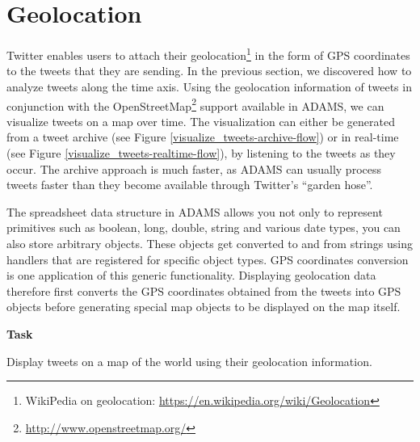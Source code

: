 \documentclass[a4paper,10pt]{book}
\newcommand{\heading}[1]{
  \vspace{0.3cm} \noindent \textbf{#1} \newline
}
\begin{document}
\clearpage
\newpage
\section{Geolocation}
Twitter enables users to attach their geolocation\footnote{WikiPedia on geolocation: \url{https://en.wikipedia.org/wiki/Geolocation}{}} in the form of GPS coordinates to the tweets that they are sending. In the previous section, we discovered how to analyze tweets along the time axis. Using the geolocation information of tweets in conjunction with the OpenStreetMap\footnote{\url{http://www.openstreetmap.org/}{}} support available in ADAMS, we can visualize tweets on a map over time. The visualization can either be generated from a tweet archive (see Figure \ref{visualize_tweets-archive-flow}) or in real-time (see Figure \ref{visualize_tweets-realtime-flow}), by listening to the tweets as they occur. The archive approach is much faster, as ADAMS can usually process tweets faster than they become available through Twitter's ``garden hose''.

The spreadsheet data structure in ADAMS allows you not only to represent primitives such as boolean, long, double, string and various date types, you can also store arbitrary objects. These objects get converted to and from strings using handlers that are registered for specific object types. GPS coordinates conversion is one application of this generic functionality. Displaying geolocation data therefore first converts the GPS coordinates obtained from the tweets into GPS objects before generating special map objects to be displayed on the map itself.

\heading{Task}
Display tweets on a map of the world using their geolocation information.
\end{document}
